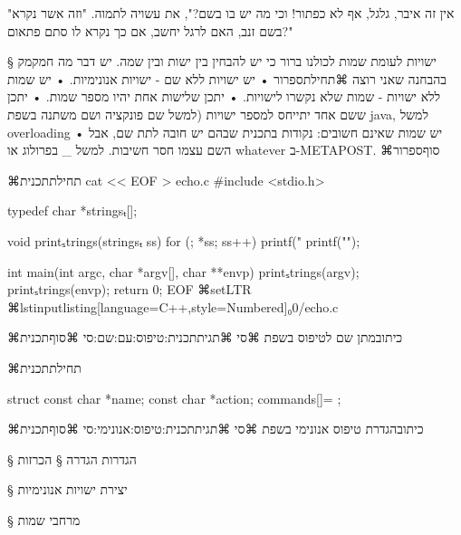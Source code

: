 "אין זה איבר, גלגל, אף לא כפתור! וכי מה יש בו בשם?", את עשויה לתמוה. "וזה אשר
נקרא בשם זנב, האם לרגל יחשב, אם כך נקרא לו סתם פתאום?"

§ ישויות לעומת שמות
לכולנו ברור כי יש להבחין בין ישות ובין שמה.
יש דבר מה חמקמק בהבחנה שאני רוצה
⌘תחילת{ספרור}
• יש ישויות ללא שם - ישויות אנונימיות.
• יש שמות ללא ישויות - שמות שלא נקשרו לישויות.
• יתכן שלישות אחת יהיו מספר שמות.
• יתכן ששם אחד יתייחס למספר ישויות (למשל שם פונקציה ושם משתנה בשפת java, למשל overloading
• יש שמות שאינם חשובים: נקודות בתכנית שבהם יש חובה לתת שם, אבל השם עצמו חסר
חשיבות. למשל _ בפרולוג או whatever ב-METAPOST.
⌘סוף{ספרור}

⌘תחילת{תכנית}
\bash
cat << EOF > echo.c
#include <stdio.h>

typedef char *stringsₜ[];

void printₛtrings(stringsₜ ss) {
  for (; *ss; ss++)
    printf("%
  printf("\n");
}

int main(int argc, char *argv[], char **envp) {
  printₛtrings(argv);
  printₛtrings(envp);
  return 0;
}
EOF
\END
⌘setLTR
⌘lstinputlisting[language=C++,style=Numbered]{₀0/echo.c}

⌘כיתוב{מתן שם לטיפוס בשפת ⌘סי}
⌘תגית{תכנית:טיפוס:עם:שם:סי}
⌘סוף{תכנית}

⌘תחילת{תכנית}
\begin{CPPn}
struct {
  const char *name;
  const char *action;
} commands[]={
};
\end{CPPn}
⌘כיתוב{הגדרת טיפוס אנונימי בשפת ⌘סי}
⌘תגית{תכנית:טיפוס:אנונימי:סי}
⌘סוף{תכנית}

§ הגדרות
הגדרה
§ הכרזות

§ יצירת ישויות אנונימיות

§ מרחבי שמות
